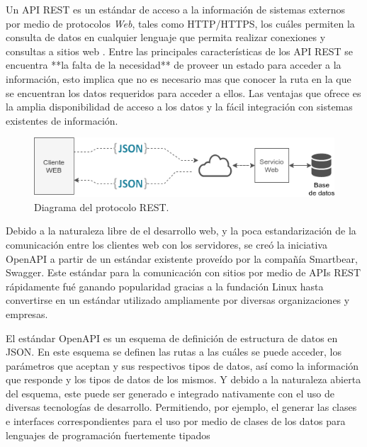 Un API REST es un estándar de acceso a la información de sistemas externos por medio de protocolos \textit{Web}, tales como HTTP/HTTPS, los cuáles permiten la consulta de datos en cualquier lenguaje que permita realizar conexiones y consultas a sitios web \cite{REST_API_design}. Entre las principales características de los API REST se encuentra **la falta de la necesidad** de proveer un estado para acceder a la información, esto implica que no es necesario mas que conocer la ruta en la que se encuentran los datos requeridos para acceder a ellos. Las ventajas que ofrece es la amplia disponibilidad de acceso a los datos y la fácil integración con sistemas existentes de información\cite{OpenAPI_example}.

\begin{figure}[!ht]
	\centering
	\includegraphics[width=.70\linewidth]{images/diagrams/REST.png}
	\caption{Diagrama del protocolo REST.}
	\label{fig:coms_nodos_raspberry}
\end{figure}


Debido a la naturaleza libre de el desarrollo web, y la poca estandarización de la comunicación entre los clientes web con los servidores, se creó la iniciativa OpenAPI a partir de un estándar existente proveído por la compañía Smartbear, Swagger. Este estándar para la comunicación con sitios por medio de APIs REST rápidamente fué ganando popularidad gracias a la fundación Linux hasta convertirse en un estándar utilizado ampliamente por diversas organizaciones y empresas\cite{OpenAPI_foundation}.

El estándar OpenAPI es un esquema de definición de estructura de datos en JSON. En este esquema se definen las rutas a las cuáles se puede acceder, los parámetros que aceptan y sus respectivos tipos de datos, así como la información que responde y los tipos de datos de los mismos. Y debido a la naturaleza abierta del esquema, este puede ser generado e integrado nativamente con el uso de diversas tecnologías de desarrollo. Permitiendo, por ejemplo, el generar las clases e interfaces correspondientes para el uso por medio de clases de los datos para lenguajes de programación fuertemente tipados\cite{openapi_generator}


